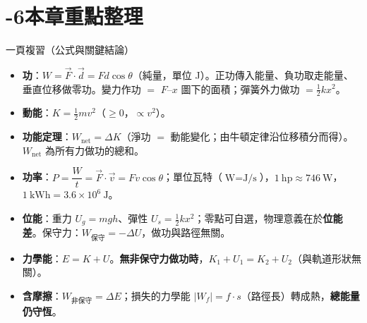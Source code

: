 \documentclass[11pt]{article}
\begin{document}
\section*{-6\quad 本章重點整理}

\begin{補充框}{一頁複習（公式與關鍵結論）}
\begin{itemize}\setlength{\itemsep}{2pt}
\item \textbf{功}：$W=\vec F\cdot\vec d=Fd\cos\theta$（純量，單位 J）。正功傳入能量、負功取走能量、垂直位移做零功。變力作功 $=$ $F$–$x$ 圖下的面積；彈簧外力做功 $=\tfrac12kx^2$。
\item \textbf{動能}：$K=\tfrac12mv^2$（$\ge0$，$\propto v^2$）。
\item \textbf{功能定理}：$W_{\text{net}}=\Delta K$（淨功 $=$ 動能變化；由牛頓定律沿位移積分而得）。$W_{\text{net}}$ 為所有力做功的總和。
\item \textbf{功率}：$P=\dfrac{W}{t}=\vec F\cdot\vec v=Fv\cos\theta$；單位瓦特（$\text{W}=\text{J/s}$），$1\ \text{hp}\approx746\ \text{W}$，$1\ \text{kWh}=3.6\times10^6\ \text{J}$。
\item \textbf{位能}：重力 $U_g=mgh$、彈性 $U_s=\tfrac12kx^2$；零點可自選，物理意義在於\textbf{位能差}。保守力：$W_{\text{保守}}=-\Delta U$，做功與路徑無關。
\item \textbf{力學能}：$E=K+U$。\textbf{無非保守力做功時}，$K_1+U_1=K_2+U_2$（與軌道形狀無關）。
\item \textbf{含摩擦}：$W_{\text{非保守}}=\Delta E$；損失的力學能 $|W_f|=f\cdot s$（路徑長）轉成熱，\textbf{總能量仍守恆}。
\end{itemize}
\end{補充框}
\end{document}
